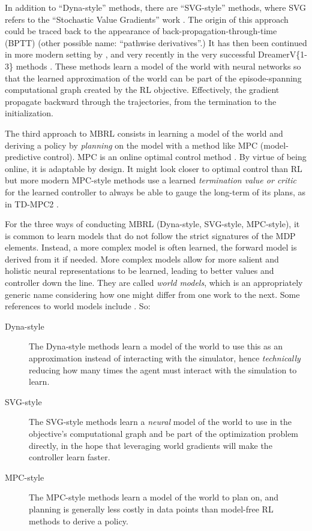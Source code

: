 \documentclass[12pt,a4paper]{article}
\begin{document}
In addition to ``Dyna-style'' methods, there are ``SVG-style'' methods, where SVG refers to the
``Stochastic Value Gradients'' work \cite{Fairbank2012-rp, Heess2015-va, Amos2021-wd}.
The origin of this approach could be traced back to the appearance of
back-propagation-through-time (BPTT)
\cite{Rumelhart1986-ls, Robinson1987-px, Nguyen1990-zx, Werbos1990-qa,
Williams1990-xw, Jordan1992-wn, Grzeszczuk1998-ij}
(other possible name: ``pathwise derivatives''.)
It has then been continued in more modern setting by \cite{Schmidhuber2011-mt, Deisenroth2011-ya}, 
and very recently in the very successful DreamerV\{1-3\} methods
\cite{Hafner2019-oa, Hafner2021-td, Hafner2023-wk, Lin2023-ql}.
These methods learn a model of the world with neural networks so that the learned approximation of
the world can be part of the episode-spanning computational graph created by the RL objective.
Effectively, the gradient propagate backward through the trajectories, from the termination to
the initialization.

The third approach to MBRL consists in learning a model of the world and deriving a
policy by \emph{planning} on the model with a method like MPC (model-predictive control).
MPC is an online optimal control method
\cite{Bryson1969-mg, Bertsekas2000-yi, Kirk2004-dq}.
By virtue of being online, it is adaptable by design.
It might look closer to optimal control than RL but more modern
MPC-style methods use a learned \textit{termination value or critic}
for the learned controller to always be able to gauge the long-term of its plans, as in
TD-MPC2 \cite{Hansen2024-ld}.

For the three ways of conducting MBRL (Dyna-style, SVG-style, MPC-style),
it is common to learn models that do not follow the strict signatures of the MDP elements.
Instead, a more complex model is often learned, the forward model is derived from it if needed.
More complex models allow for more salient and holistic neural representations to be learned,
leading to better values and controller down the line. They are called \emph{world models},
which is an appropriately generic name considering how one might differ from one work to the next.
Some references to world models include
\cite{Ha2018-sa, Hafner2018-zm, Hessel2021-ah, Micheli2023-mr, Ding2024-oq, Alonso2024-jo}.
So:
\begin{description}
    \item[Dyna-style]
        The Dyna-style methods learn a model of the world to use this as an approximation
        instead of interacting with the simulator, hence \emph{technically} reducing how many times
        the agent must interact with the simulation to learn.
    \item[SVG-style]
        The SVG-style methods learn a \emph{neural} model of the world to use in the objective's
        computational graph and be part of the optimization problem directly,
        in the hope that leveraging world gradients will make the controller learn faster.
    \item[MPC-style]
        The MPC-style methods learn a model of the world to plan on, and planning is generally
        less costly in data points than model-free RL methods to derive a policy.
\end{description}
\end{document}
